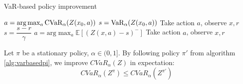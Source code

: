 \begin{algorithm}
\caption{VaR-based policy improvement}
\label{alg:varbasedpi}
\begin{algorithmic}
    \STATE $a = \text{arg}\max_a \text{CVaR}_\alpha(Z(x_0, a))$
    \STATE $s = \text{VaR}_\alpha(Z(x_0, a))$
    \STATE Take action $a$, observe $x, r$
    	\STATE $s = \dfrac{s-r}{\gamma}$
    	\STATE $a = \text{arg}\max_a \mathbb{E}\left[(Z(x, a)-s)^- \right]$
    	\STATE Take action $a$, observe $x, r$
   	\ENDWHILE
\end{algorithmic}
\end{algorithm}

\begin{theorem}
Let $\pi$ be a stationary policy, $\alpha \in (0, 1]$. 
By following policy $\pi'$ from algorithm \ref{alg:varbasedpi}, we improve $CVaR_\alpha(Z)$ in expectation:
$$CVaR_\alpha(Z^\pi) \le CVaR_\alpha(Z^{\pi'})$$
%
%

\end{theorem}

